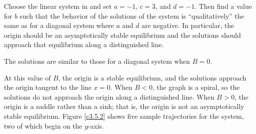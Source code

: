 \documentclass{ximera}
\begin{document}
\begin{exercise} \label{c3.5.2}
Choose the {\sf linear system} in {\pplane} and set
$a=-1$, $c=3$, and $d=-1$.
Then find a value for $b$ such that the behavior of the
solutions of the system is ``qualitatively'' the same as for a
diagonal system where $a$ and $d$ are negative.  In particular,
the origin should be an asymptotically stable equilibrium and
the solutions should approach that equilibrium along a
distinguished line.

\begin{solution}

\ans The solutions are similar to those for a diagonal system when
$B = 0$.

\soln At this value of $B$, the origin is a stable equilibrium, and the
solutions approach the origin tangent to the line $x = 0$.  When $B < 0$,
the graph is a spiral, so the solutions do not approach the origin along
a distinguished line.  When $B > 0$, the origin is a saddle rather
than a sink; that is, the origin is not an asymptotically stable
equilibrium.  Figure \ref{c3.5.2} shows five sample trajectories
for the system, two of which begin on the $y$-axis.

\begin{figure}[htb]
                       \centerline{%
                       }
\end{figure}

\end{solution}
\end{exercise}
\end{document}
